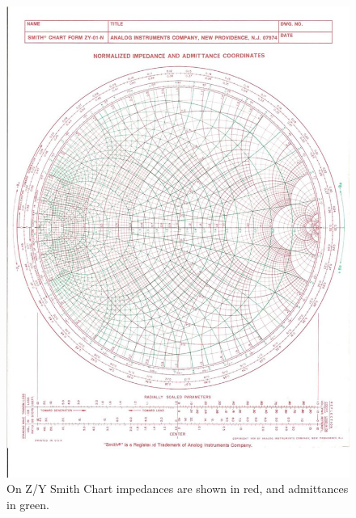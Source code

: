 \documentclass{ximera}
\begin{document}
\begin{enumerate}
\begin{figure}[htbp]
\begin{center}
\includegraphics[scale=0.3]{../jpg/SCadmimp.jpg}
\end{center}
\caption{On Z/Y Smith Chart impedances are shown in red, and admittances in green.}
\label{fig:SCDerscadmimp1}
\end{figure}

\end{enumerate} 
 
\end{document}
